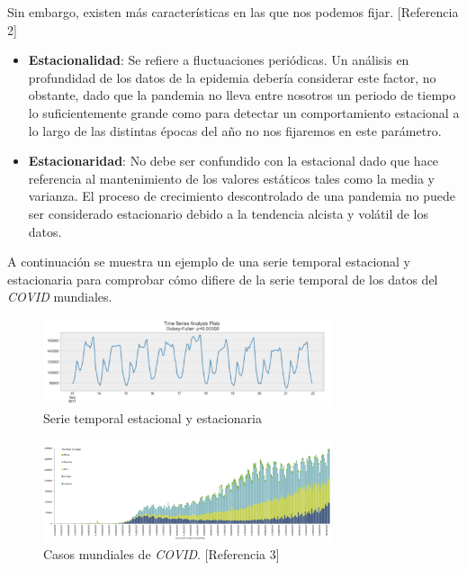 \documentclass[12pt,a4paper, xcolor=table]{article}
\begin{document}
        Sin embargo, existen más características en las que nos podemos fijar. [Referencia 2]
    \begin{itemize}
    \item \textbf{Estacionalidad}: Se refiere a fluctuaciones periódicas. Un análisis en profundidad de los datos de la epidemia debería considerar este factor, no obstante, dado que la pandemia no lleva entre nosotros un periodo de tiempo lo suficientemente grande como para detectar un comportamiento estacional a lo largo de las distintas épocas del año no nos fijaremos en este parámetro.
    \item \textbf{Estacionaridad}: No debe ser confundido con la estacional dado que hace referencia al mantenimiento de los valores estáticos tales como la media y varianza. El proceso de crecimiento descontrolado de una pandemia no puede ser considerado estacionario debido a la tendencia alcista y volátil de los datos.
    \end{itemize}

    A continuación se muestra un ejemplo de una serie temporal estacional y estacionaria para comprobar cómo difiere de la serie temporal de los datos del \textit{COVID} mundiales.

        \begin{figure}[h]
                \centering
                \includegraphics[width=320px]{img/estacional.png}
                \captionsetup{labelformat=empty}
                \caption{Serie temporal estacional y estacionaria}
            \end{figure}





        \begin{figure}[h]
                \centering
                \includegraphics[width=320px]{img/covid-cases.png}
                \captionsetup{labelformat=empty}
                \caption{Casos mundiales de \textit{COVID}. [Referencia 3]}
            \end{figure}
\end{document}
